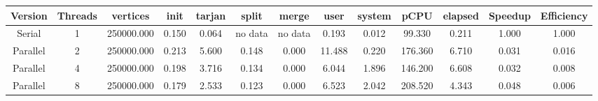 \begin{tabular}{|c|c|c|c|c|c|c|c|c|c|c|c|c|}
\toprule
 Version &  Threads &   vertices &  init &  tarjan &   split &   merge &   user &  system &    pCPU &  elapsed &  Speedup &  Efficiency \\
\midrule
  Serial &        1 & 250000.000 & 0.150 &   0.064 & no data & no data &  0.193 &   0.012 &  99.330 &    0.211 &    1.000 &       1.000 \\
Parallel &        2 & 250000.000 & 0.213 &   5.600 &   0.148 &   0.000 & 11.488 &   0.220 & 176.360 &    6.710 &    0.031 &       0.016 \\
Parallel &        4 & 250000.000 & 0.198 &   3.716 &   0.134 &   0.000 &  6.044 &   1.896 & 146.200 &    6.608 &    0.032 &       0.008 \\
Parallel &        8 & 250000.000 & 0.179 &   2.533 &   0.123 &   0.000 &  6.523 &   2.042 & 208.520 &    4.343 &    0.048 &       0.006 \\
\bottomrule
\end{tabular}
